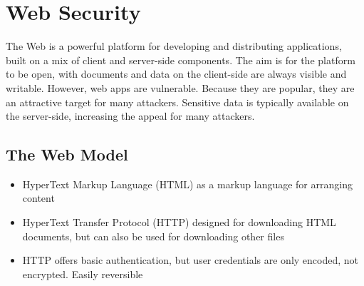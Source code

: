 \documentclass{article}
\begin{document}
\section{Web Security}
The Web is a powerful platform for developing and distributing applications, built on a mix of client and server-side components. The aim is for the platform to be open, with documents and data on the client-side are always visible and writable. However, web apps are vulnerable. Because they are popular, they are an attractive target for many attackers. Sensitive data is typically available on the server-side, increasing the appeal for many attackers.
\subsection{The Web Model}
\begin{itemize}
    \item HyperText Markup Language (HTML) as a markup language for arranging content
    \item HyperText Transfer Protocol (HTTP) designed for downloading HTML documents, but can also be used for downloading other files
    \item HTTP offers basic authentication, but user credentials are only encoded, not encrypted. Easily reversible
\end{itemize}
\end{document}

